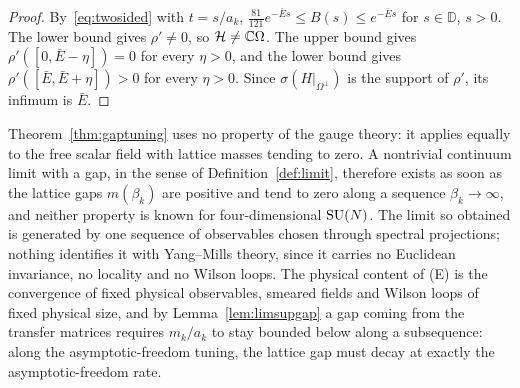 \begin{proof}
By~\eqref{eq:twosided} with $t=s/a_k$, $\frac{81}{121}e^{-\bar Es}\le B(s)\le e^{
-\bar Es}$ for $s\in\mathbb D$, $s>0$. The lower bound gives $\rho'\ne0$, so
$\mathcal H\ne\mathbb{C}\Omega$. The upper bound gives $\rho'([0,\bar E-\eta])=0$ for
every $\eta>0$, and the lower bound gives $\rho'([\bar E,\bar E+\eta])>0$ for
every $\eta>0$. Since $\sigma(H|_{\Omega^\perp})$ is the support of $\rho'$, its
infimum is $\bar E$.
\end{proof}

Theorem~\ref{thm:gaptuning} uses no property of the gauge theory: it applies
equally to the free scalar field with lattice masses tending to zero. A
nontrivial continuum limit with a gap, in the sense of
Definition~\ref{def:limit}, therefore exists as soon as the lattice gaps
$m(\beta_k)$ are positive and tend to zero along a sequence $\beta_k\to\infty$,
and neither property is known for four-dimensional $\mathrm{SU}(N)$. The limit so
obtained is generated by one sequence of observables chosen through spectral
projections; nothing identifies it with Yang--Mills theory, since it carries no
Euclidean invariance, no locality and no Wilson loops. The physical content of
(E) is the convergence of fixed physical observables, smeared fields and Wilson
loops of fixed physical size, and by Lemma~\ref{lem:limsupgap} a gap coming
from the transfer matrices requires $m_k/a_k$ to stay bounded below along a
subsequence: along the asymptotic-freedom tuning, the lattice gap must decay at
exactly the asymptotic-freedom rate.
